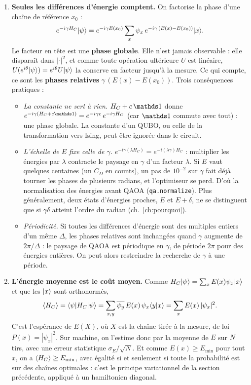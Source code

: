 \begin{enumerate}
\item \textbf{Seules les différences d'énergie comptent.} On factorise la phase d'une chaîne de référence $x_0$ :
\[ e^{-i\gamma H_C}\lvert \psi\rangle=e^{-i\gamma E(x_0)}\sum_x\psi_x\,e^{-i\gamma\,(E(x)-E(x_0))}\lvert x\rangle. \]
Le facteur en tête est une \textbf{phase globale}. Elle n'est jamais observable : elle disparaît dans $|\cdot|^2$, et comme toute opération ultérieure $U$ est linéaire, $U(e^{i\theta}\lvert \psi\rangle)=e^{i\theta}U\lvert \psi\rangle$ la conserve en facteur jusqu'à la mesure. Ce qui compte, ce sont les \textbf{phases relatives} $\gamma\,(E(x)-E(x_0))$. Trois conséquences pratiques :
\begin{itemize}
\item \emph{La constante ne sert à rien.} $H_C+c\,\Id$ donne $e^{-i\gamma(H_C+c\Id)}=e^{-i\gamma c}\,e^{-i\gamma H_C}$ (car $\Id$ commute avec tout) : une phase globale. La constante d'un QUBO, ou celle de la transformation vers Ising, peut être ignorée dans le circuit.
\item \emph{L'échelle de $E$ fixe celle de $\gamma$.} $e^{-i\gamma(\lambda H_C)}=e^{-i(\lambda\gamma)H_C}$ : multiplier les énergies par $\lambda$ contracte le paysage en $\gamma$ d'un facteur $\lambda$. Si $E$ vaut quelques centaines (un $C_D$ en counts), un pas de $10^{-2}$ sur $\gamma$ fait déjà tourner les phases de plusieurs radians, et l'optimiseur se perd. D'où la normalisation des énergies avant QAOA (\texttt{qa.normalize}). Plus généralement, deux états d'énergies proches, $E$ et $E+\delta$, ne se distinguent que si $\gamma\delta$ atteint l'ordre du radian (ch.~\ref{ch:pourquoi}).
\item \emph{Périodicité.} Si toutes les différences d'énergie sont des multiples entiers d'un même $\Delta$, les phases relatives sont inchangées quand $\gamma$ augmente de $2\pi/\Delta$ : le paysage de QAOA est périodique en $\gamma$, de période $2\pi$ pour des énergies entières. On peut alors restreindre la recherche de $\gamma$ à une période.
\end{itemize}

\item \textbf{L'énergie moyenne est le coût moyen.} Comme $H_C\lvert \psi\rangle=\sum_xE(x)\psi_x\lvert x\rangle$ et que les $\lvert x\rangle$ sont orthonormés,
\[ \langle H_C\rangle=\langle \psi\rvert H_C\lvert \psi\rangle=\sum_{x,y}\overline{\psi_y}\,E(x)\,\psi_x\langle y\vert x\rangle=\sum_xE(x)\,|\psi_x|^2. \]
C'est l'espérance de $E(X)$, où $X$ est la chaîne tirée à la mesure, de loi $P(x)=|\psi_x|^2$. Sur machine, on l'estime donc par la moyenne de $E$ sur $N$ tirs, avec une erreur statistique $\sigma_E/\sqrt N$. Et comme $E(x)\ge E_{\min}$ pour tout $x$, on a $\langle H_C\rangle\ge E_{\min}$, avec égalité si et seulement si toute la probabilité est sur des chaînes optimales : c'est le principe variationnel de la section précédente, appliqué à un hamiltonien diagonal.


\end{enumerate}
